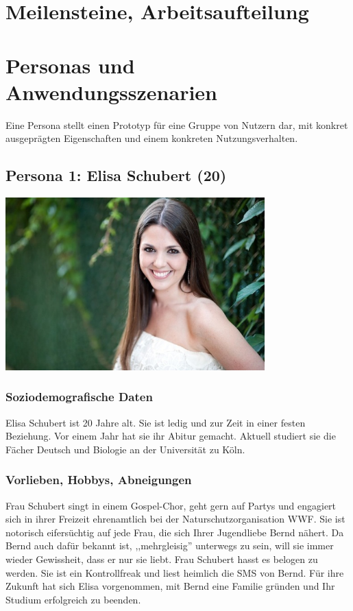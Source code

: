 \documentclass[10pt, a4paper, oneside, titlepage]{scrartcl} %
\begin{document}
	\newpage
   	\section{Meilensteine, Arbeitsaufteilung}
   
   	\newpage
   	\section{Personas und Anwendungsszenarien}
   	Eine Persona stellt einen Prototyp für eine Gruppe von Nutzern dar, mit konkret ausgeprägten Eigenschaften und einem konkreten Nutzungsverhalten.
   	
	\subsection{Persona 1: Elisa Schubert (20)}
	\begin{center}
		\includegraphics[width=10.0cm]{persona_01.jpg}
	\end{center}
	\subsubsection{Soziodemografische Daten}
	Elisa Schubert ist 20 Jahre alt. Sie ist ledig und zur Zeit in einer festen Beziehung. Vor einem Jahr hat sie ihr Abitur gemacht. Aktuell studiert sie die Fächer Deutsch und Biologie an der Universität zu Köln.
	\subsubsection{Vorlieben, Hobbys, Abneigungen}
	Frau Schubert singt in einem Gospel-Chor, geht gern auf Partys und engagiert sich in ihrer Freizeit ehrenamtlich bei der Naturschutzorganisation WWF. Sie ist notorisch eifersüchtig auf jede Frau, die sich Ihrer Jugendliebe Bernd nähert. Da Bernd auch dafür bekannt ist, ,,mehrgleisig'' unterwegs zu sein, will sie immer wieder Gewissheit, dass er nur sie liebt. Frau Schubert hasst es belogen zu werden. Sie ist ein Kontrollfreak und liest heimlich die SMS von Bernd. Für ihre Zukunft hat sich Elisa vorgenommen, mit Bernd eine Familie gründen und Ihr Studium erfolgreich zu beenden. 
\end{document}
